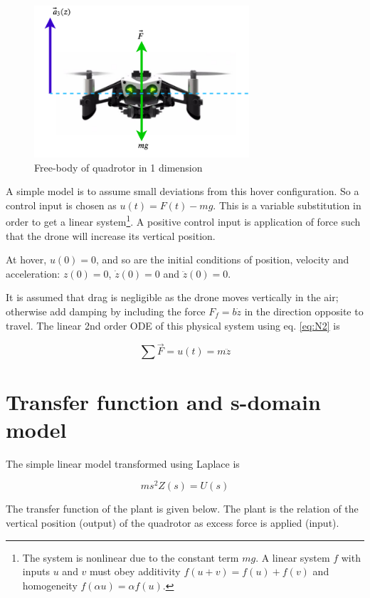 \documentclass[a4paper]{report}
\begin{document}
\begin{figure}[H]
\centering
\includegraphics[width=8cm]{img/phy_1d.png}
\caption{Free-body of quadrotor in 1 dimension\label{fig:phy_1d}}
\end{figure}

A simple model is to assume small deviations from this hover configuration. So a control input is chosen as $u(t)=F(t)-mg$. 
This is a variable substitution in order to get a linear system\footnote{
The system is nonlinear due to the constant term $mg$.
A linear system $f$ with inputs $u$ and $v$ must obey additivity $f(u+v)=f(u)+f(v)$ and homogeneity $f(\alpha u) = \alpha f(u)$.
}. 
A positive control input is application of force such that the drone will increase its vertical position.

At hover, $u(0)=0$, and so are the initial conditions of position, velocity and acceleration:
$z(0)=0$, $\dot{z}(0)=0$ and  $\ddot{z}(0)=0$.

It is assumed that drag is negligible as the drone moves vertically in the air; otherwise add damping by including the force $F_f = b \dot{z}$ in the direction opposite to travel.
The linear 2nd order \gls{ODE} of this physical system using eq. \ref{eq:N2} is

\begin{equation} \label{eq:model_1d}
\sum \vec{F} = u(t) = m \ddot{z}
\end{equation}

\section{Transfer function and s-domain model}

The simple linear model transformed using Laplace is 

\begin{equation} \label{eq:model_1d_s}
m s^2 Z(s) = U(s)
\end{equation}

The transfer function of the plant is given below. The plant is the relation of the vertical position (output) of the quadrotor as excess force is applied (input).
\end{document}
